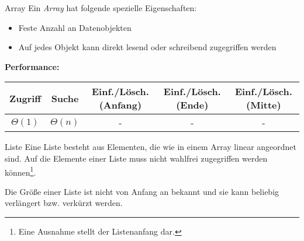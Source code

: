 \begin{defi}{Array}
    Ein \emph{Array} hat folgende spezielle Eigenschaften:
    \begin{itemize}
        \item Feste Anzahl an Datenobjekten
        \item Auf jedes Objekt kann direkt lesend oder schreibend zugegriffen werden
    \end{itemize}

    \begin{center}
    \end{center}

    \textbf{Performance:}

    \begin{center}
        \begin{tabular}{c|c|c|c|c}
            Zugriff     & Suche       & Einf./Lösch. (Anfang) & Einf./Lösch. (Ende) & Einf./Lösch. (Mitte) \\
            \hline
            $\Theta(1)$ & $\Theta(n)$ & -                     & -                   & -                    \\
        \end{tabular}
    \end{center}
\end{defi}

\begin{defi}{Liste}
    Eine Liste besteht aus Elementen, die wie in einem Array linear angeordnet sind.
    Auf die Elemente einer Liste muss nicht wahlfrei zugegriffen werden können\footnote{Eine Ausnahme stellt der Listenanfang dar.}.

    Die Größe einer Liste ist nicht von Anfang an bekannt und sie kann beliebig verlängert bzw. verkürzt werden.
\end{defi}

